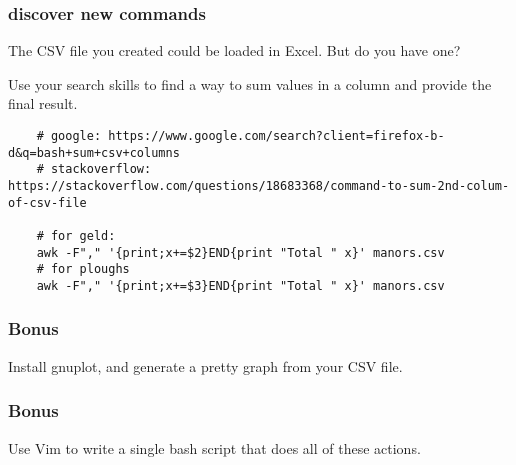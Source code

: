 \ifdefined\answer
\inputminted[firstline=25,lastline=31]{bash}{TD1_Linux_shell_answers.sh}
\fi

\subsubsection{discover new commands}

The CSV file you created could be loaded in Excel. But do you have one?

Use your search skills to find a way to sum values in a column and provide the final result.

\ifdefined\answer
\begin{verbatim}
    # google: https://www.google.com/search?client=firefox-b-d&q=bash+sum+csv+columns
    # stackoverflow: https://stackoverflow.com/questions/18683368/command-to-sum-2nd-colum-of-csv-file

    # for geld:
    awk -F"," '{print;x+=$2}END{print "Total " x}' manors.csv
    # for ploughs
    awk -F"," '{print;x+=$3}END{print "Total " x}' manors.csv
\end{verbatim}
\fi

\subsubsection{Bonus}

Install gnuplot, and generate a pretty graph from your CSV file.

\subsubsection{Bonus}

Use Vim to write a single bash script that does all of these actions.

